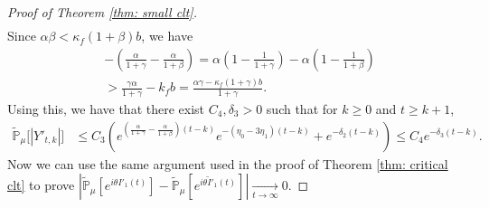 \documentclass[12pt,a4paper]{amsart}
\theoremstyle{plain}
\theoremstyle{definition}
\numberwithin{equation}{section}
\begin{document}
\begin{proof}[Proof of Theorem \ref{thm: small clt}]
\begin{align}
  \end{align}
  Since $\alpha\beta<\kappa_f(1+\beta)b$,  we have
  \begin{align}
    \label{eq: condition for supercritical}
    & -(\frac{\alpha}{1+\gamma}-\frac{\alpha}{1+\beta})
      = \alpha(1-\frac{1}{1+\gamma}) - \alpha(1-\frac{1}{1+\beta}) \\
    & > \frac{\gamma \alpha}{1+\gamma} - k_f b
      =\frac{\alpha \gamma-\kappa_f(1+\gamma)b}{1+\gamma}.
  \end{align}
  Using this, we have that there exist $C_4, \delta_3 > 0$ such that for $k\geq 0$ and $t\geq k+1$,
  \begin{align}
    \mathbb{\widetilde{P}}_{\mu}\big[|Y'_{t,k}|\big]
    & \leq C_3( e^{(\frac{\alpha}{1+\gamma} - \frac{\alpha}{1+\beta})(t-k)}e^{-(\eta_0 - 3\eta_1)(t-k)}+ e^{-\delta_2(t-k)})
    \leq C_4e^{-\delta_3 (t-k)}.
  \end{align}
  Now we can  use the  same argument used in the proof of Theorem \ref{thm: critical clt} to prove $|\mathbb{\widetilde{P}}_{\mu}[e^{i\theta I'_1(t)}]-\mathbb{\widetilde{P}}_{\mu}[e^{i\theta\widetilde I'_1(t)}]|\xrightarrow[t\to \infty]{} 0$.


\end{proof}
\end{document}
